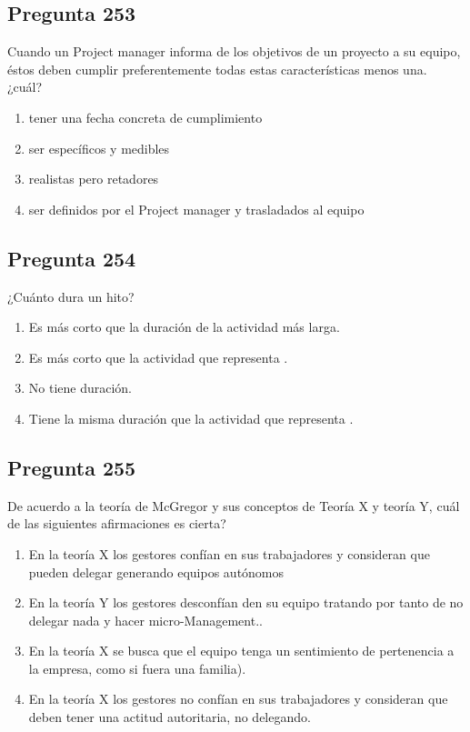 \documentclass[11pt,a4paper]{article}
\begin{document}
\subsection*{Pregunta 253}
Cuando un Project manager informa de los objetivos de un proyecto a su equipo, éstos deben cumplir preferentemente todas estas características menos una. ¿cuál?

\begin{enumerate}[label=\alph*)]
  \item tener una fecha concreta de cumplimiento
  \item ser específicos y medibles
  \item realistas pero retadores
  \item ser definidos por el Project manager y trasladados al equipo
\end{enumerate}

\subsection*{Pregunta 254}
¿Cuánto dura un hito?

\begin{enumerate}[label=\alph*)]
  \item Es más corto que la duración de la actividad más larga.
  \item Es más corto que la actividad que representa .
  \item No tiene duración.
  \item Tiene la misma duración que la actividad que representa .
\end{enumerate}

\subsection*{Pregunta 255}
De acuerdo a la teoría de McGregor y sus conceptos de Teoría X y teoría Y, cuál de las siguientes afirmaciones es cierta?

\begin{enumerate}[label=\alph*)]
  \item En la teoría X los gestores confían en sus trabajadores y consideran que pueden delegar generando equipos autónomos
  \item En la teoría Y los gestores desconfían den su equipo tratando por tanto de no delegar nada y hacer micro-Management..
  \item En la teoría X se busca que el equipo tenga un sentimiento de pertenencia a la empresa, como si fuera una familia).
  \item En la teoría X los gestores no confían en sus trabajadores y consideran que deben tener una actitud autoritaria, no delegando.
\end{enumerate}
\end{document}
